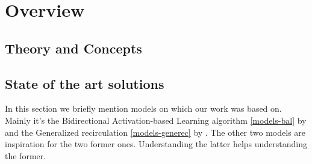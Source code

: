 



\section{Overview}

\subsection{Theory and Concepts}

 
\label{theory} 


\label{models-bp} 

\subsection{State of the art solutions}
\label{overview-models}  

In this section we briefly mention models on which our work was based on. Mainly it's the Bidirectional Activation-based Learning algorithm \ref{models-bal} by \citet{farkas2013bal} and the Generalized recirculation \ref{models-generec} by \citet{o1996bio}. The other two models are inspiration for the two former ones. Understanding the latter helps understanding the former. 










 
